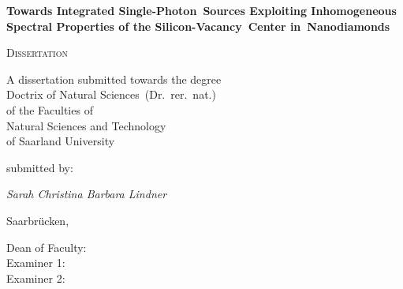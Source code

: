




\begin{titlepage}
	\centering
	\null\vfill

	{\huge\bfseries Towards Integrated Single-Photon~Sources Exploiting Inhomogeneous Spectral Properties of the Silicon-Vacancy~Center in~Nanodiamonds\par}



	\vfill

	{\scshape\Large Dissertation}
	\vfill


	{\large A dissertation submitted towards the degree\\
	Doctrix of Natural Sciences~(Dr.~rer.~nat.)\\
	of the Faculties of\\
  Natural Sciences and Technology\\
	of Saarland University}


	\vfill
	submitted by:
	\vfill

	{\Large\itshape Sarah Christina Barbara Lindner}

	\vfill

	{\large Saarbr\"ucken, \thesisdate{}}
	\vfill
\end{titlepage}



\newpage
\thispagestyle{plain}
\null
\vfill
\begin{description}
 	\item[Dean of Faculty:] %
	\item[Examiner 1:] %
	\item[Examiner 2:] %
\end{description}

\newpage



